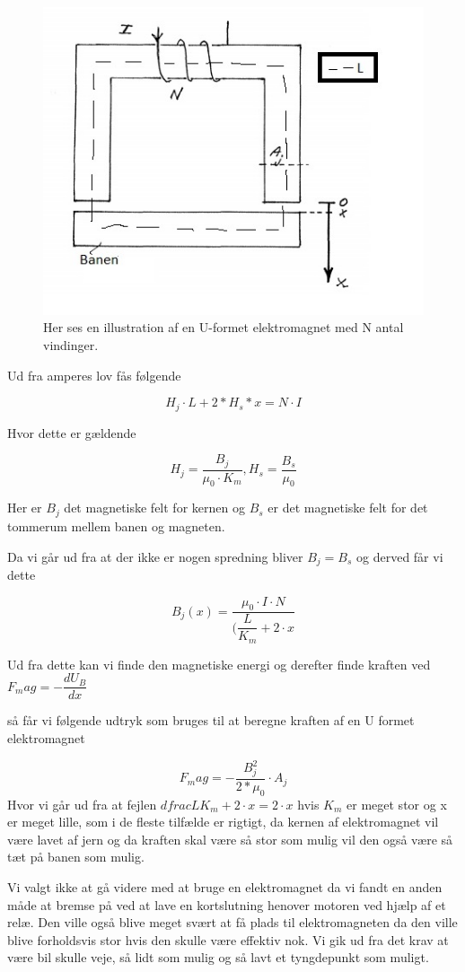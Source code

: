 \begin{figure}[h]

	\centering
		\includegraphics[scale=0.8]{Billeder/elektromagnet.jpg}
	\caption{Her ses en illustration af en U-formet elektromagnet med N antal vindinger.}
	\label{fig:elektromagnet}
\end{figure}

Ud fra amperes lov fås følgende


$$H_j \cdot L+2*H_s*x = N \cdot I$$

Hvor dette er gældende

$$H_j = \dfrac{B_j}{\mu_0 \cdot K_m}, H_s = \dfrac{B_s}{\mu_0}$$

Her er $B_j$ det magnetiske felt for kernen og $B_s$ er det magnetiske felt for det tommerum mellem banen og magneten.

Da vi går ud fra at der ikke er nogen spredning bliver $B_j = B_s$ og derved får vi dette


$$B_j(x) = \dfrac{\mu_0 \cdot I \cdot N}{(\dfrac{L}{K_m}+2 \cdot x}$$

Ud fra dette kan vi finde den magnetiske energi og derefter finde kraften ved $F_mag = -\dfrac{dU_B}{dx}$

så får vi følgende udtryk som bruges til at beregne kraften af en U formet elektromagnet

\begin{equation}
F_mag = - \dfrac{B_j^2}{2*\mu_0} \cdot A_j
\end{equation}
Hvor vi går ud fra at fejlen $dfrac{L}{K_m}+2 \cdot x = 2 \cdot x$ hvis $K_m$ er meget stor og x er meget lille, som i de fleste tilfælde er rigtigt, da kernen af elektromagnet vil være lavet af jern og da kraften skal være så stor som mulig vil den også være så tæt på banen som mulig.

Vi valgt ikke at gå videre med at bruge en elektromagnet da vi fandt en anden måde at bremse på ved at lave en kortslutning henover motoren ved hjælp af et relæ. Den ville også blive meget svært at få plads til elektromagneten da den ville blive forholdsvis stor hvis den skulle være effektiv nok. Vi gik ud fra det krav at være bil skulle veje, så lidt som mulig og så lavt et tyngdepunkt som muligt. 